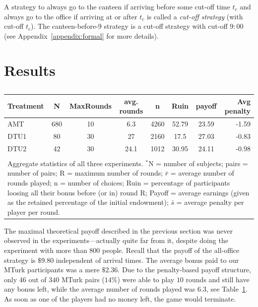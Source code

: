 \documentclass[twocolumn,a4paper,superscriptaddress,nofootinbib]{revtex4}
\begin{document}
A strategy to always go to the canteen if arriving before some cut-off time $t_c$ and always go to the office if arriving at or after $t_c$ is called a \emph{cut-off strategy} (with cut-off $t_c$). The canteen-before-9 strategy is a cut-off strategy with cut-off $9{:}00$ (see Appendix~\ref{appendix:formal} for more details).

\section{Results}
\label{S:results}
\begin{table}%
\caption{} %

\smallskip
\centering
\setlength{\arrayrulewidth}{1pt}
\begin{tabular}{l|ccccccr}
\hline
Treatment   &   N &   MaxRounds &   avg. rounds &    n &   Ruin &   payoff &   Avg penalty \\
\hline
AMT         & 680 &          10 &          6.3 & 4260 &  52.79 &    23.59 &         -1.59 \\
DTU1        &  80 &          30 &         27    & 2160 &  17.5  &    27.03 &         -0.83 \\
DTU2        &  42 &          30 &         24.1  & 1012 &  30.95 &    24.11 &         -0.98 \\
\hline  \multicolumn{7}{c}{} \\[-2mm]
\multicolumn{8}{p{14cm}}{Aggregate statistics of all three experiments. $^*$N = number of subjects; pairs = number of pairs; R = maximum number of rounds; $\bar r$ = average number of rounds played; n = number of choices; Ruin = percentage of participants loosing all their bonus before (or in) round R; Payoff = average earnings (given as the retained percentage of the initial endowment); $\bar s$ = average penalty per player per round.} \\
\end{tabular}
\label{table:1}
\end{table}
The maximal theoretical payoff described in the previous section was never observed in the experiments---actually quite far from it, despite doing the experiment with more than $800$ people. Recall that the payoff of the all-office strategy is $\$9.80$ independent of arrival times. The average bonus paid to our MTurk participants was a mere $\$2.36$. Due to the penalty-based payoff structure, only 46 out of $340$ MTurk pairs ($14\%$) were able to play $10$ rounds and still have any bonus left, while the average number of rounds played was $6.3$, see Table~\ref{table:1}. As soon as one of the players had no money left, the game would terminate.
\end{document}
